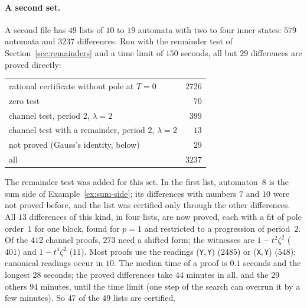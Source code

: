 \documentclass[11pt,a4paper]{article}
\theoremstyle{plain}
\theoremstyle{definition}
\theoremstyle{remark}
\begin{document}
\paragraph{A second set.} A second file has $49$ lists of $10$ to $19$ automata
with two to four inner states: $579$ automata and $3237$ differences. Run with
the remainder test of Section~\ref{sec:remainders} and a time limit of $150$
seconds, all but $29$ differences are proved directly:
\begin{center}
\begin{tabular}{@{}lr@{}}
\toprule
rational certificate without pole at $T=0$ & $2726$\\
zero test & $70$\\
channel test, period $2$, $\lambda=2$ & $399$\\
channel test with a remainder, period $2$, $\lambda=2$ & $13$\\
not proved (Gauss's identity, below) & $29$\\\midrule
all & $3237$\\
\bottomrule
\end{tabular}
\end{center}
The remainder test was added for this set. In the first list, automaton~$8$ is
the sum side of Example~\ref{ex:sum-side}; its differences with numbers $7$ and
$10$ were not proved before, and the list was certified only through the other
differences. All $13$ differences of this kind, in four lists, are now proved,
each with a fit of pole order~$1$ for one block, found for $p=1$ and restricted
to a progression of period~$2$. Of the $412$ channel proofs, $273$ need a shifted form; the
witnesses are $1-t^2\zeta^2$ ($401$) and $1-t^4\zeta^2$ ($11$). Most proofs use
the readings (\texttt{Y},\,\texttt{Y}) ($2485$) or (\texttt{X},\,\texttt{Y})
($548$); canonical readings occur in $10$. The median time of a proof is $0.1$
seconds and the longest $28$ seconds; the proved differences take $44$ minutes
in all, and the $29$ others $94$ minutes, until the time limit (one step of the
search can overrun it by a few minutes). So $47$ of the $49$ lists are
certified.
\end{document}
